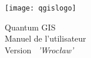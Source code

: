
\begin{titlepage}
\begin{center}

\begin{center}
\texttt{[image: qgislogo]} 
\end{center}

\Huge{Quantum GIS}\\
\vspace{0.5cm}
\Large{Manuel de l'utilisateur} \\
\vspace{0.5cm}
\Large{Version ~\CURRENT \textsl{'Wrocław'}}

\end{center}
\end{titlepage}

